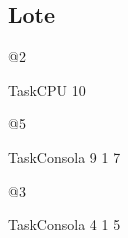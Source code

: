 \subsection{Lote}
\begin{framed}

@2

TaskCPU 10

@5 

TaskConsola 9 1 7

@3

TaskConsola 4 1 5


\end{framed}

